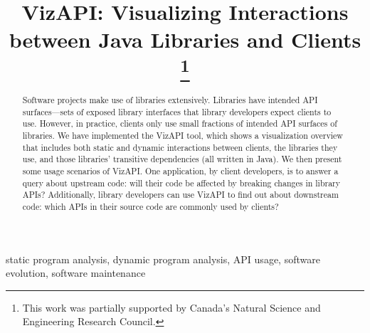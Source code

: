 \documentclass[conference]{IEEEtran}
\begin{document}
\title{VizAPI: Visualizing Interactions between Java Libraries and Clients
\thanks{This work was partially supported by Canada's Natural Science and Engineering Research Council.}
}

\author{
\and
{}
}

\maketitle

\begin{abstract}
Software projects make use of libraries extensively. Libraries have intended API surfaces—sets of exposed library interfaces that library developers expect clients to use. However, in practice, clients only use small fractions of intended API surfaces of libraries. We have implemented the VizAPI tool, which shows a visualization overview that includes both static and dynamic interactions between clients, the libraries they use, and  those libraries’ transitive dependencies (all written in Java). We then present some usage scenarios of VizAPI. One application, by client developers, is to answer a query about upstream code: will their code be affected by breaking changes in library APIs? Additionally, library developers can use VizAPI to find out about downstream code: which APIs in their source code are commonly used by clients? 
\end{abstract}

\begin{IEEEkeywords}
static program analysis,
dynamic program analysis,
API usage,
software evolution,
software maintenance
\end{IEEEkeywords}
\end{document}
